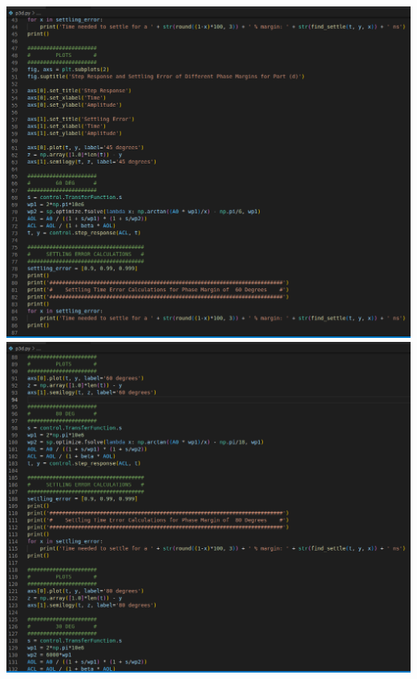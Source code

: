 \documentclass[12pt, fleqn]{article}
\begin{document}
\begin{enumerate}[label=(\alph*)]
{        \includegraphics[scale=0.3, center]{p3d_code2.PNG}\\[0.25cm]
        \newpage
        \includegraphics[scale=0.3, center]{p3d_code3.PNG}\\[0.25cm]
}
\end{enumerate}
\end{document}

